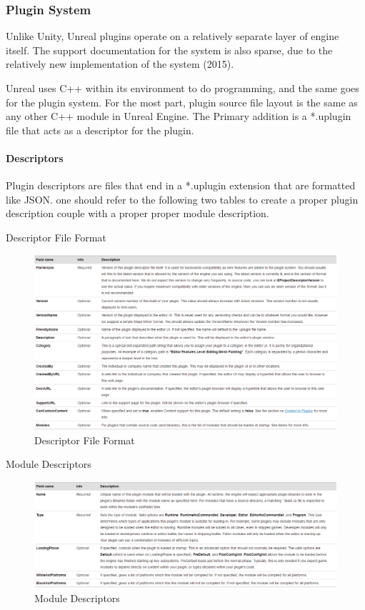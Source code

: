 \documentclass[12pt]{article}
\begin{document}
\subsubsection{Plugin System}\label{plugin-system}

Unlike Unity, Unreal plugins operate on a relatively separate layer of
engine itself. The support documentation for the system is also sparse,
due to the relatively new implementation of the system (2015).

Unreal uses C++ within its environment to do programming, and the same
goes for the plugin system. For the most part, plugin source file layout
is the same as any other C++ module in Unreal Engine. The Primary
addition is a *.uplugin file that acts as a descriptor for the plugin.

\paragraph{Descriptors}\label{descriptors}

Plugin descriptors are files that end in a *.uplugin extension that are
formatted like JSON. one should refer to the following two tables to
create a proper plugin description couple with a proper proper module
description.

Descriptor File Format \autocite{unreal:plugins}

\begin{figure}
\centering
\includegraphics{Pictures/Descriptor.PNG}
\caption{Descriptor File Format}
\end{figure}

Module Descriptors \autocite{unreal:plugins}

\begin{figure}
\centering
\includegraphics{Pictures/ModuleD.PNG}
\caption{Module Descriptors}
\end{figure}
\end{document}
